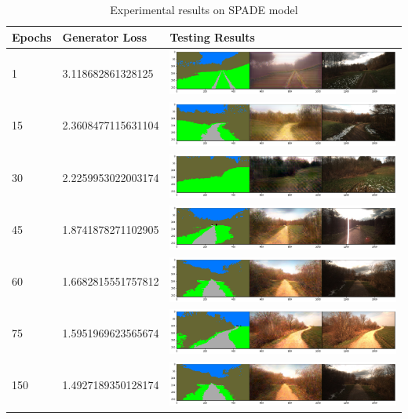 \begin{table}[H]
    \begin{center}
    \begin{tabular}{|l|l|l|}\hline\hline
    Epochs&Generator Loss&Testing Results\\
    \hline
    1&3.118682861328125&\includegraphics[width=8cm]{figures/spade-epoch-1}\\
    15&2.3608477115631104&\includegraphics[width=8cm]{figures/spade-epoch-15}\\
    30&2.2259953022003174&\includegraphics[width=8cm]{figures/spade-epoch-30}\\
    45&1.8741878271102905&\includegraphics[width=8cm]{figures/spade-epoch-45}\\
    60&1.6682815551757812&\includegraphics[width=8cm]{figures/spade-epoch-60}\\
    75&1.5951969623565674&\includegraphics[width=8cm]{figures/spade-epoch-75}\\
    150&1.4927189350128174&\includegraphics[width=8cm]{figures/spade-epoch-150}\\
    \hline\hline
    \end{tabular}
    \end{center}
    \caption{Experimental results on SPADE model}
    \label{experimental results on SPADE}
\end{table}


